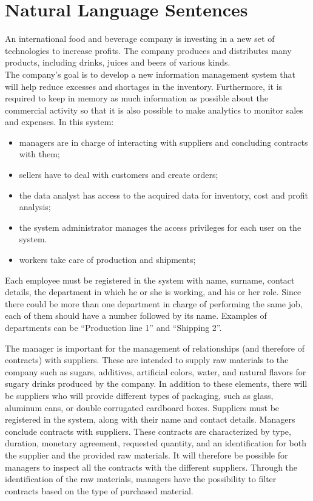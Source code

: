 \section{Natural Language Sentences}

An international food and beverage company is investing in a new set of technologies to increase profits. The company produces and distributes many products, including drinks, juices and beers of various kinds.\\

The company's goal is to develop a new information management system that will help reduce excesses and shortages in the inventory. Furthermore, it is required to keep in memory as much information as possible about the commercial activity so that it is also possible to make analytics to monitor sales and expenses. In this system:
\begin{itemize}
    \item managers are in charge of interacting with suppliers and concluding contracts with them;
    \item sellers have to deal with customers and create orders;
    \item the data analyst has access to the acquired data for inventory, cost and profit analysis;
    \item the system administrator manages the access privileges for each user on the system.
    \item workers take care of production and shipments;
\end{itemize}
Each employee must be registered in the system with name, surname, contact details, the department in which he or she is working, and his or her role. Since there could be more than one department in charge of performing the same job, each of them should have a number followed by its name. Examples of departments can be ``Production line 1'' and ``Shipping 2''.

The manager is important for the management of relationships (and therefore of contracts) with suppliers. These are intended to supply raw materials to the company such as sugars, additives, artificial colors, water, and natural flavors for sugary drinks produced by the company. In addition to these elements, there will be suppliers who will provide different types of packaging, such as glass, aluminum cans, or double corrugated cardboard boxes. Suppliers must be registered in the system, along with their name and contact details. Managers conclude contracts with suppliers. These contracts are characterized by type, duration, monetary agreement, requested quantity, and an identification for both the supplier and the provided raw materials. It will therefore be possible for managers to inspect all the contracts with the different suppliers. Through the identification of the raw materials, managers have the possibility to filter contracts based on the type of purchased material.\\

